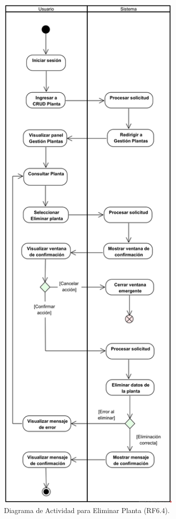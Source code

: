 \begin{figure}[H]
	\centering
	\caption{Diagrama de Actividad para Eliminar Planta (RF6.4).}
 \includegraphics[width=0.8\textwidth]{UML/Actividad/Diagrama de Actividad RF6.4 Eliminar Planta.png}
\end{figure}


